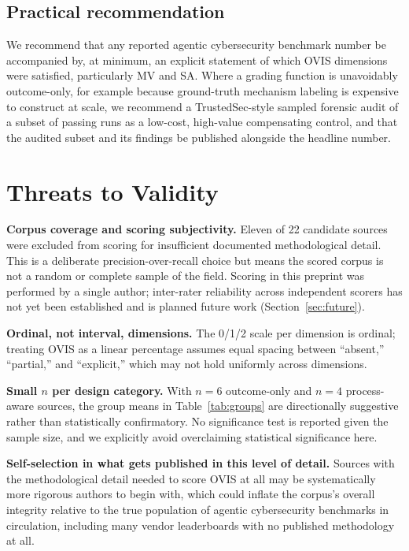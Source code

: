 \documentclass[10pt,twocolumn]{article}
\begin{document}
\subsection{Practical recommendation}
We recommend that any reported agentic cybersecurity benchmark number be
accompanied by, at minimum, an explicit statement of which OVIS
dimensions were satisfied, particularly MV and SA. Where a grading
function is unavoidably outcome-only, for example because ground-truth
mechanism labeling is expensive to construct at scale, we recommend a
TrustedSec-style sampled forensic audit of a subset of passing runs as a
low-cost, high-value compensating control, and that the audited subset
and its findings be published alongside the headline number.

\section{Threats to Validity}
\label{sec:threats}

\textbf{Corpus coverage and scoring subjectivity.} Eleven of 22
candidate sources were excluded from scoring for insufficient documented
methodological detail. This is a deliberate precision-over-recall choice
but means the scored corpus is not a random or complete sample of the
field. Scoring in this preprint was performed by a single author;
inter-rater reliability across independent scorers has not yet been
established and is planned future work (Section~\ref{sec:future}).

\textbf{Ordinal, not interval, dimensions.} The 0/1/2 scale per
dimension is ordinal; treating OVIS as a linear percentage assumes equal
spacing between ``absent,'' ``partial,'' and ``explicit,'' which may not
hold uniformly across dimensions.

\textbf{Small $n$ per design category.} With $n{=}6$ outcome-only and
$n{=}4$ process-aware sources, the group means in Table~\ref{tab:groups}
are directionally suggestive rather than statistically confirmatory. No
significance test is reported given the sample size, and we explicitly
avoid overclaiming statistical significance here.

\textbf{Self-selection in what gets published in this level of detail.}
Sources with the methodological detail needed to score OVIS at all may
be systematically more rigorous authors to begin with, which could
inflate the corpus's overall integrity relative to the true population
of agentic cybersecurity benchmarks in circulation, including many
vendor leaderboards with no published methodology at all.
\end{document}
